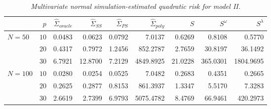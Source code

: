 \begin{table}[H]
\centering
\caption{\textit{Multivariate normal simulation-estimated quadratic risk  for model II.} }
\begin{tabular}{lrrrrrrrr}
& $p$ &$\hat{\Sigma}_{oracle}$&$\hat{\Sigma}_{SS}$& $\hat{\Sigma}_{PS}$ & $\hat{\Sigma}_{poly}$ & $S$ &$S^\omega$& $S^\lambda$ \\ 
  \hline
$N = 50$ & $10$ & 0.0483 & 0.0623 & 0.0792 & 7.0137 & 0.6269 & 0.8108 & 0.5770 \\ 
    & $20$ & 0.4317 & 0.7972 & 1.2456 &  852.2787 & 2.7659 & 30.8197 & 36.1492 \\ 
     & $30$ & 6.7921 & 12.8700 & 7.2129 & 4849.8925 & 21.0228 & 365.0301 & 1804.9695 \\ 
     $N = 100$ & $10$ &0.0280 & 0.0254 & 0.0525 &  7.0482 & 0.2683 & 0.4351 & 0.2665 \\ 
    & $20$ &0.2625 & 0.2877 & 0.8153 &  861.3937 & 1.3347 & 5.5170 & 7.3283 \\ 
     & $30$ &2.6619 & 2.7399 & 6.9793 &  5075.4782 & 8.4769 & 66.9461 & 420.2973 \\ 

   \hline
\end{tabular}
\label{table:simulation-1-quad-loss-sigma-2}
\end{table}
 
